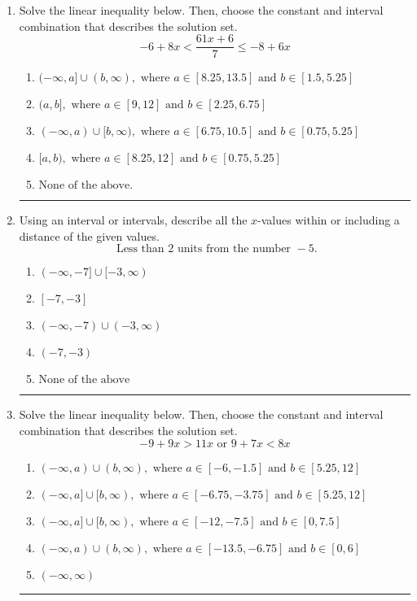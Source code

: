 \documentclass[14pt]{extbook}
\newcommand{\litem}[1]{\item#1\hspace*{-1cm}\rule{\textwidth}{0.4pt}}
\begin{document}
\begin{enumerate}
{\begin{enumerate}[label=\Alph*.]
\end{enumerate} }
\litem{
Solve the linear inequality below. Then, choose the constant and interval combination that describes the solution set.\[ -6 + 8 x < \frac{61 x + 6}{7} \leq -8 + 6 x \]\begin{enumerate}[label=\Alph*.]
\item \( (-\infty, a] \cup (b, \infty), \text{ where } a \in [8.25, 13.5] \text{ and } b \in [1.5, 5.25] \)
\item \( (a, b], \text{ where } a \in [9, 12] \text{ and } b \in [2.25, 6.75] \)
\item \( (-\infty, a) \cup [b, \infty), \text{ where } a \in [6.75, 10.5] \text{ and } b \in [0.75, 5.25] \)
\item \( [a, b), \text{ where } a \in [8.25, 12] \text{ and } b \in [0.75, 5.25] \)
\item \( \text{None of the above.} \)

\end{enumerate} }
\litem{
Using an interval or intervals, describe all the $x$-values within or including a distance of the given values.\[ \text{ Less than } 2 \text{ units from the number } -5. \]\begin{enumerate}[label=\Alph*.]
\item \( (-\infty, -7] \cup [-3, \infty) \)
\item \( [-7, -3] \)
\item \( (-\infty, -7) \cup (-3, \infty) \)
\item \( (-7, -3) \)
\item \( \text{None of the above} \)

\end{enumerate} }
\litem{
Solve the linear inequality below. Then, choose the constant and interval combination that describes the solution set.\[ -9 + 9 x > 11 x \text{ or } 9 + 7 x < 8 x \]\begin{enumerate}[label=\Alph*.]
\item \( (-\infty, a) \cup (b, \infty), \text{ where } a \in [-6, -1.5] \text{ and } b \in [5.25, 12] \)
\item \( (-\infty, a] \cup [b, \infty), \text{ where } a \in [-6.75, -3.75] \text{ and } b \in [5.25, 12] \)
\item \( (-\infty, a] \cup [b, \infty), \text{ where } a \in [-12, -7.5] \text{ and } b \in [0, 7.5] \)
\item \( (-\infty, a) \cup (b, \infty), \text{ where } a \in [-13.5, -6.75] \text{ and } b \in [0, 6] \)
\item \( (-\infty, \infty) \)


\end{enumerate}}
\end{enumerate}
\end{document}
